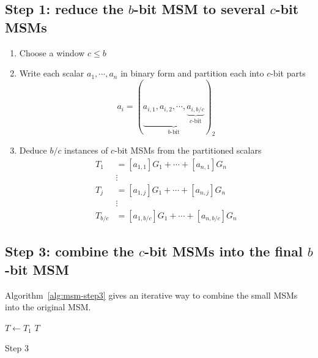 \documentclass[journal=tches,spthm]{iacrtrans}
\begin{document}
\subsection{Step 1: reduce the $b$-bit MSM to several $c$-bit MSMs}
\begin{enumerate}
\item Choose a window $c \leq b$
\item Write each scalar $a_1, \cdots, a_n$ in binary form and partition each into $c$-bit parts
    $$ a_i = (\underbrace{a_{i,1}, a_{i,2}, \cdots, \underbrace{a_{i,b/c}}_\text{$c$-bit}}_\text{$b$-bit})_{2} $$
\item Deduce $b/c$ instances of $c$-bit MSMs from the partitioned scalars
    \begin{align*}
        T_1 &= [a_{1,1}]G_1 + \cdots + [a_{n,1}]G_n \\
        &\vdots \\
        T_j &= [a_{1,j}]G_1 + \cdots + [a_{n,j}]G_n \\
        &\vdots \\
        T_{b/c} &= [a_{1,b/c}]G_1 + \cdots + [a_{n,b/c}]G_n
    \end{align*}
\end{enumerate}

\begin{center}
\end{center}

\subsection{Step 3: combine the $c$-bit MSMs into the final $b$-bit MSM\\}
Algorithm~\ref{alg:msm-step3} gives an iterative way to combine the small MSMs into the original MSM.
%
\begin{algorithm}[hbt]
  \SetAlgoLined
   $T \leftarrow T_1$\;
  \Return $T$\;
  \caption{Step 3}
  \label{alg:msm-step3}
\end{algorithm}

\begin{center}
\end{center}
\end{document}
